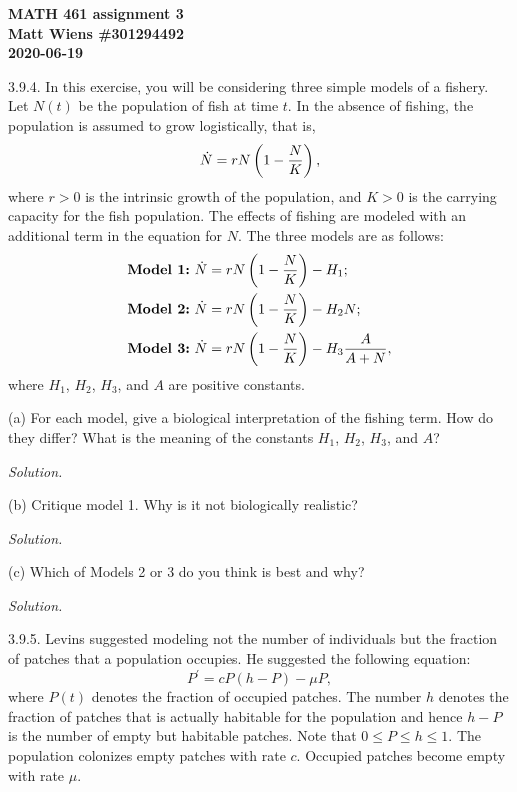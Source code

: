 \documentclass{article}
\begin{document}
\textbf{MATH 461 assignment 3} \\
\textbf{Matt Wiens \#301294492} \\
\textbf{2020-06-19}

3.9.4. In this exercise, you will be considering three simple models of
a fishery. Let $N(t)$ be the population of fish at time $t$. In the
absence of fishing, the population is assumed to grow logistically,
that is,
%
\begin{equation*}
    \dot N = r N \del{1 - \frac{N}{K}}
    ,
\end{equation*}
%
where $r > 0$ is the intrinsic growth of the population, and $K >0$ is
the carrying capacity for the fish population. The effects of fishing
are modeled with an additional term in the equation for $N$. The three
models are as follows:
%
\begin{align*}
    \text{\textbf{Model 1:}} \ \dot N &= r N \del{1 - \frac{N}{K}} - H_1; \\
    \text{\textbf{Model 2:}} \ \dot N &= r N \del{1 - \frac{N}{K}} - H_2 N; \\
    \text{\textbf{Model 3:}} \ \dot N &= r N \del{1 - \frac{N}{K}} - H_3 \frac{A}{A + N},
\end{align*}
%
where $H_1$, $H_2$, $H_3$, and $A$ are positive constants.

(a) For each model, give a biological interpretation of the fishing
term. How do they differ? What is the meaning of the constants $H_1$,
$H_2$, $H_3$, and $A$?

\textit{Solution.}

\vspace{5mm}

(b) Critique model 1. Why is it not biologically realistic?

\textit{Solution.}

\vspace{5mm}

(c) Which of Models 2 or 3 do you think is best and why?

\textit{Solution.}

\newpage

3.9.5. Levins suggested modeling not the number of individuals but the
fraction of patches that a population occupies. He suggested the
following equation:
%
\begin{equation*}
    P^\prime = c P (h - P) - \mu P
    ,
\end{equation*}
%
where $P(t)$ denotes the fraction of occupied patches. The number $h$
denotes the fraction of patches that is actually habitable for the
population and hence $h - P$ is the number of empty but habitable
patches. Note that $0 \leq P \leq h \leq 1$. The population colonizes
empty patches with rate $c$. Occupied patches become empty with rate
$\mu$.
\end{document}
